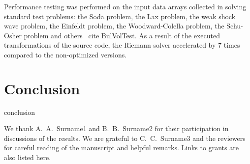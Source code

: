 \documentclass[
11pt,%
tightenlines,%
twoside,%
onecolumn,%
nofloats,%
nobibnotes,%
nofootinbib,%
superscriptaddress,%
noshowpacs,%
centertags]%
{revtex4}
\begin{document}
Performance testing was performed on the input data arrays collected in solving standard test problems: the Soda problem, the Lax problem, the weak shock wave problem, the Einfeldt problem, the Woodward-Colella problem, the Schu-Osher problem and others \ cite {BulVolTest}. As a result of the executed transformations of the source code, the Riemann solver accelerated by 7 times compared to the non-optimized versions.

\section{Conclusion}

conclusion

\begin{acknowledgments}
We thank A.~A.~Surname1 and B.~B.~Surname2 for their participation in discussions of the results. We are grateful to C.~C.~Surname3 and the reviewers for careful reading of the manuscript and helpful remarks. Links to grants are also listed here.
\end{acknowledgments}
\end{document}
